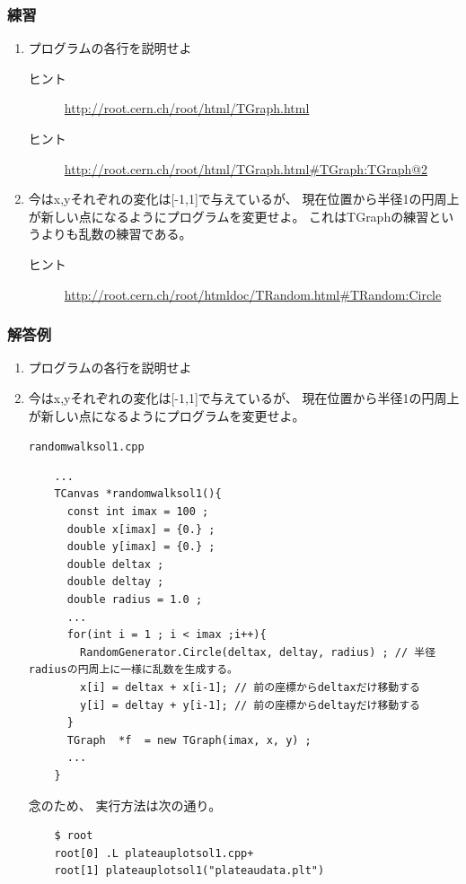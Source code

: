    \subsubsection{練習}
   \begin{enumerate}
    \item プログラムの各行を説明せよ
	  \begin{description}
	   \item[ヒント] \url{http://root.cern.ch/root/html/TGraph.html}
	   \item[ヒント] \url{http://root.cern.ch/root/html/TGraph.html#TGraph:TGraph@2}
	  \end{description}
    \item 今はx,yそれぞれの変化は[-1,1]で与えているが、
	  現在位置から半径1の円周上が新しい点になるようにプログラムを変更せよ。
	  これはTGraphの練習というよりも乱数の練習である。
	  \begin{description}
	   \item[ヒント] \url{http://root.cern.ch/root/htmldoc/TRandom.html#TRandom:Circle}
	  \end{description}

   \end{enumerate}

   \subsubsection{解答例}

   \begin{enumerate}
    \item プログラムの各行を説明せよ
    \item 今はx,yそれぞれの変化は[-1,1]で与えているが、
	  現在位置から半径1の円周上が新しい点になるようにプログラムを変更せよ。
	  \begin{itembox}{\texttt{randomwalksol1.cpp}}
\begin{verbatim}
	...
	TCanvas *randomwalksol1(){
	  const int imax = 100 ;
	  double x[imax] = {0.} ;
	  double y[imax] = {0.} ;
	  double deltax ;
	  double deltay ;
	  double radius = 1.0 ;
	  ...
	  for(int i = 1 ; i < imax ;i++){
	    RandomGenerator.Circle(deltax, deltay, radius) ; // 半径radiusの円周上に一様に乱数を生成する。
	    x[i] = deltax + x[i-1]; // 前の座標からdeltaxだけ移動する
	    y[i] = deltay + y[i-1]; // 前の座標からdeltayだけ移動する
	  }
	  TGraph  *f  = new TGraph(imax, x, y) ;
	  ...
	}
\end{verbatim}
	  \end{itembox}
	  念のため、
	  実行方法は次の通り。
\begin{verbatim}
	$ root
	root[0] .L plateauplotsol1.cpp+
	root[1] plateauplotsol1("plateaudata.plt")
\end{verbatim}
   \end{enumerate}